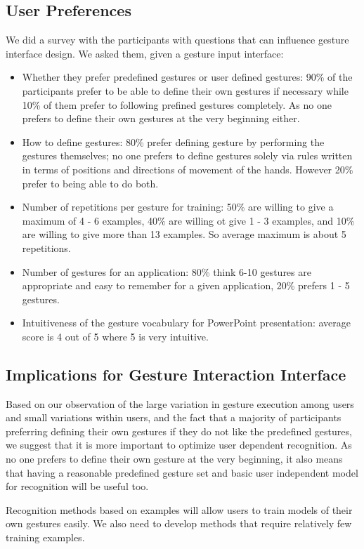 \documentclass[conference]{IEEEtran}
\begin{document}
\subsection{User Preferences}
We did a survey with the participants with questions that can influence
gesture interface design. We asked them, given a gesture input interface:
\begin{itemize}
  \item Whether they prefer predefined gestures or user defined gestures: 90\%
  of the participants prefer to be able to define their own gestures if necessary while 10\% of them prefer to following prefined
gestures completely. As no one prefers to define their own gestures at the very
beginning either.
\item How to define gestures: 80\% prefer defining gesture by 
performing the gestures themselves; no one prefers to
define gestures solely via rules written in terms of positions and directions
of movement of the hands.
However 20\% prefer to being able to do both.
\item Number of repetitions per gesture for training: 50\% are willing to give a
maximum of 4 - 6 examples, 40\% are willing ot give 1 - 3 examples, and 10\% are
willing to give more than 13 examples. So average maximum is about 5
repetitions.
\item Number of gestures for an application: 80\% think 6-10 gestures are
appropriate and easy to remember for a given application, 20\% prefers 1 - 5
gestures.
\item Intuitiveness of the gesture vocabulary for PowerPoint presentation:
average score is 4 out of 5 where 5 is very intuitive.
\end{itemize}

\subsection{Implications for Gesture Interaction Interface}
Based on our observation of the large variation in gesture execution among
users and small variations within users, and the fact that a majority of
participants preferring defining their own gestures if they do not like the
predefined gestures, we suggest that it is more important to optimize user
dependent recognition. As no one prefers to define their own gesture at the very
beginning, it also means that having a reasonable predefined gesture set and
basic user independent model for recognition will be useful too.

Recognition methods based on examples will allow users to train models of their
own gestures easily. We also need to develop methods that
require relatively few training examples.
\end{document}
